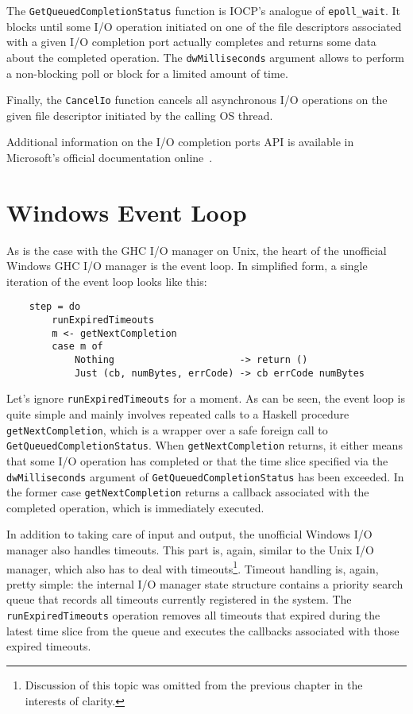 \documentclass[a4paper,11pt,oneside]{report}
\begin{document}
The \texttt{GetQueuedCompletionStatus} function is IOCP's analogue of
\texttt{epoll\_wait}. It blocks until some I/O operation initiated on one of the
file descriptors associated with a given I/O completion port actually completes
and returns some data about the completed operation. The \texttt{dwMilliseconds}
argument allows to perform a non-blocking poll or block for a limited amount of
time.

Finally, the \texttt{CancelIo} function cancels all asynchronous I/O operations
on the given file descriptor initiated by the calling OS thread.

Additional information on the I/O completion ports API is available in
Microsoft's official documentation online~\cite{bib:msdn}.

\section{Windows Event Loop}

As is the case with the GHC I/O manager on Unix, the heart of the unofficial
Windows GHC I/O manager is the event loop. In simplified form, a single
iteration of the event loop looks like this:

\begin{verbatim}
    step = do
        runExpiredTimeouts
        m <- getNextCompletion
        case m of
            Nothing                      -> return ()
            Just (cb, numBytes, errCode) -> cb errCode numBytes
\end{verbatim}

Let's ignore \texttt{runExpiredTimeouts} for a moment. As can be seen, the event
loop is quite simple and mainly involves repeated calls to a Haskell procedure
\texttt{getNextCompletion}, which is a wrapper over a safe foreign call to
\texttt{GetQueuedCompletionStatus}. When \texttt{getNextCompletion} returns, it
either means that some I/O operation has completed or that the time slice
specified via the \texttt{dwMilliseconds} argument of
\texttt{GetQueuedCompletionStatus} has been exceeded. In the former case
\texttt{getNextCompletion} returns a callback associated with the completed
operation, which is immediately executed.

In addition to taking care of input and output, the unofficial Windows I/O
manager also handles timeouts. This part is, again, similar to the Unix I/O
manager, which also has to deal with timeouts\footnote{Discussion of this topic
  was omitted from the previous chapter in the interests of clarity.}. Timeout
handling is, again, pretty simple: the internal I/O manager state structure
contains a priority search queue that records all timeouts currently registered
in the system. The \texttt{runExpiredTimeouts} operation removes all timeouts
that expired during the latest time slice from the queue and executes the
callbacks associated with those expired timeouts.
\end{document}
